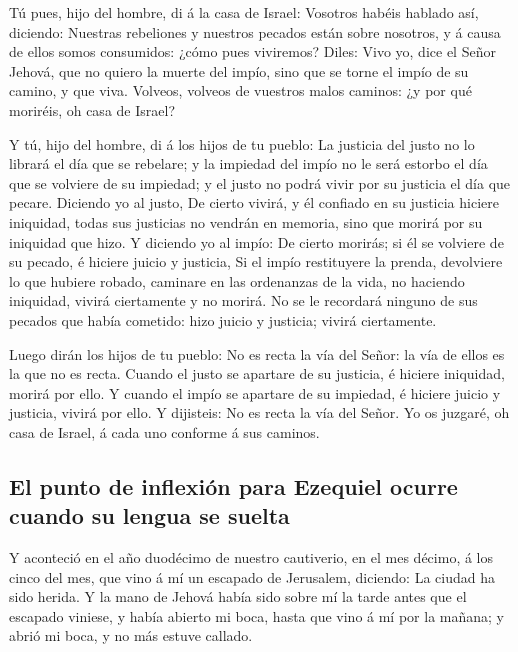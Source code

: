  Tú pues, hijo del hombre, di á la casa de Israel: Vosotros
habéis hablado así, diciendo: Nuestras rebeliones y nuestros pecados
están sobre nosotros, y á causa de ellos somos consumidos: ¿cómo pues
viviremos?  Diles: Vivo yo, dice el Señor Jehová, que no
quiero la muerte del impío, sino que se torne el impío de su camino, y
que viva. Volveos, volveos de vuestros malos caminos: ¿y por qué
moriréis, oh casa de Israel?

 Y tú, hijo del hombre, di á los hijos de tu pueblo: La
justicia del justo no lo librará el día que se rebelare; y la impiedad
del impío no le será estorbo el día que se volviere de su impiedad; y el
justo no podrá vivir por su justicia el día que pecare. 
Diciendo yo al justo, De cierto vivirá, y él confiado en su justicia
hiciere iniquidad, todas sus justicias no vendrán en memoria, sino que
morirá por su iniquidad que hizo.  Y diciendo yo al impío:
De cierto morirás; si él se volviere de su pecado, é hiciere juicio y
justicia,  Si el impío restituyere la prenda, devolviere lo
que hubiere robado, caminare en las ordenanzas de la vida, no haciendo
iniquidad, vivirá ciertamente y no morirá.  No se le
recordará ninguno de sus pecados que había cometido: hizo juicio y
justicia; vivirá ciertamente.

 Luego dirán los hijos de tu pueblo: No es recta la vía del
Señor: la vía de ellos es la que no es recta.  Cuando el
justo se apartare de su justicia, é hiciere iniquidad, morirá por ello.
 Y cuando el impío se apartare de su impiedad, é hiciere
juicio y justicia, vivirá por ello.  Y dijisteis: No es
recta la vía del Señor. Yo os juzgaré, oh casa de Israel, á cada uno
conforme á sus caminos.

\hypertarget{el-punto-de-inflexiuxf3n-para-ezequiel-ocurre-cuando-su-lengua-se-suelta}{%
\subsection{El punto de inflexión para Ezequiel ocurre cuando su lengua
se
suelta}\label{el-punto-de-inflexiuxf3n-para-ezequiel-ocurre-cuando-su-lengua-se-suelta}}

 Y aconteció en el año duodécimo de nuestro cautiverio, en
el mes décimo, á los cinco del mes, que vino á mí un escapado de
Jerusalem, diciendo: La ciudad ha sido herida.  Y la mano
de Jehová había sido sobre mí la tarde antes que el escapado viniese, y
había abierto mi boca, hasta que vino á mí por la mañana; y abrió mi
boca, y no más estuve callado.

